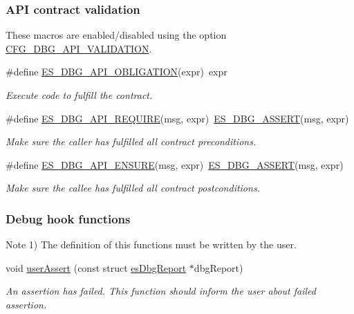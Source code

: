 \subsubsection*{A\-P\-I contract validation}
\label{_amgrp33843f28ec14798e89b4f60be2c8f813}%
These macros are enabled/disabled using the option \hyperlink{group__dbg__cfg_ga64e39c477ef9d900b82585150329e3f0}{C\-F\-G\-\_\-\-D\-B\-G\-\_\-\-A\-P\-I\-\_\-\-V\-A\-L\-I\-D\-A\-T\-I\-O\-N}. \begin{DoxyCompactItemize}
\item 
\#define \hyperlink{group__dbg__intf_ga4f697c4030269ec84d7cff3d3a536dc7}{E\-S\-\_\-\-D\-B\-G\-\_\-\-A\-P\-I\-\_\-\-O\-B\-L\-I\-G\-A\-T\-I\-O\-N}(expr)~expr
\begin{DoxyCompactList}\small\item\em Execute code to fulfill the contract. \end{DoxyCompactList}\item 
\#define \hyperlink{group__dbg__intf_ga3989d15e2662496b037dbe87f6ae876c}{E\-S\-\_\-\-D\-B\-G\-\_\-\-A\-P\-I\-\_\-\-R\-E\-Q\-U\-I\-R\-E}(msg, expr)~\hyperlink{group__dbg__intf_ga3826c957cc3aed7873397c0dac0b7030}{E\-S\-\_\-\-D\-B\-G\-\_\-\-A\-S\-S\-E\-R\-T}(msg, expr)
\begin{DoxyCompactList}\small\item\em Make sure the caller has fulfilled all contract preconditions. \end{DoxyCompactList}\item 
\#define \hyperlink{group__dbg__intf_ga87674b53b8204d141c9041ae9f267c3e}{E\-S\-\_\-\-D\-B\-G\-\_\-\-A\-P\-I\-\_\-\-E\-N\-S\-U\-R\-E}(msg, expr)~\hyperlink{group__dbg__intf_ga3826c957cc3aed7873397c0dac0b7030}{E\-S\-\_\-\-D\-B\-G\-\_\-\-A\-S\-S\-E\-R\-T}(msg, expr)
\begin{DoxyCompactList}\small\item\em Make sure the callee has fulfilled all contract postconditions. \end{DoxyCompactList}\end{DoxyCompactItemize}
\subsubsection*{Debug hook functions}
\label{_amgrpaa57f14e4b6b196d434344510d6c89c5}%
\begin{DoxyNote}{Note}
1) The definition of this functions must be written by the user. 
\end{DoxyNote}
\begin{DoxyCompactItemize}
\item 
void \hyperlink{group__dbg__intf_gaeffe9bfb4bdcfe9d824bfa4686cc969e}{user\-Assert} (const struct \hyperlink{structesDbgReport}{es\-Dbg\-Report} $\ast$dbg\-Report)
\begin{DoxyCompactList}\small\item\em An assertion has failed. This function should inform the user about failed assertion. \end{DoxyCompactList}\end{DoxyCompactItemize}


